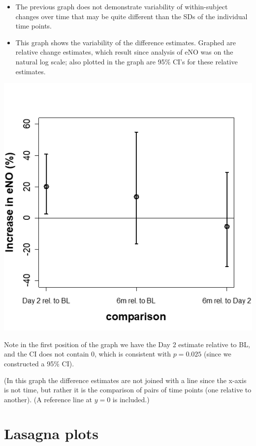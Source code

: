 \documentclass[
  9pt,
  ignorenonframetext,
]{beamer}
\begin{document}
\begin{frame}{}
\protect\hypertarget{section-5}{}
\begin{itemize}
\item
  The previous graph does not demonstrate variability of within-subject
  changes over time that may be quite different than the SDs of the
  individual time points.
\item
  This graph shows the variability of the difference estimates. Graphed
  are relative change estimates, which result since analysis of eNO was
  on the natural log scale; also plotted in the graph are 95\% CI's for
  these relative estimates.\\
  \tiny
\end{itemize}

\begin{center}\includegraphics[width=0.4\linewidth]{figs_L2/L2-f9} \end{center}

\tiny

\tiny

Note in the first position of the graph we have the Day 2 estimate
relative to BL, and the CI does not contain 0, which is consistent with
\(p=0.025\) (since we constructed a 95\% CI).

(In this graph the difference estimates are not joined with a line since
the x-axis is not time, but rather it is the comparison of pairs of time
points (one relative to another). (A reference line at \(y=0\) is
included.)
\end{frame}

\hypertarget{lasagna-plots}{%
\section{Lasagna plots}\label{lasagna-plots}}
\end{document}
